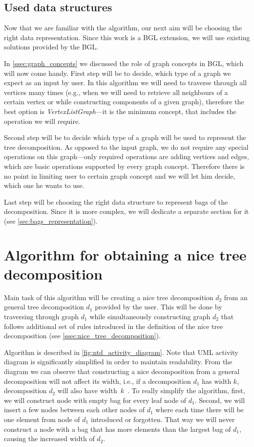 \documentclass[thesis=B,english]{FITthesis}[2019/03/21]
\begin{document}
\subsection{Used data structures}\label{ssec:td_data_structures}
Now that we are familiar with the algorithm, our next aim will be choosing the right data representation. Since this work is a BGL extension, we will use existing solutions provided by the BGL.

In \autoref{ssec:graph_concepts} we discussed the role of graph concepts in BGL, which will now come handy. First step will be to decide, which type of a graph we expect as an input by user. In this algorithm we will need to traverse through all vertices many times (e.g., when we will need to retrieve all neighbours of a certain vertex or while constructing components of a given graph), therefore the best option is \emph{VertexListGraph}---it is the minimum concept, that includes the operation we will require.

Second step will be to decide which type of a graph will be used to represent the tree decomposition. As opposed to the input graph, we do not require any special operations on this graph---only required operations are adding vertices and edges, which are basic operations supported by every graph concept. Therefore there is no point in limiting user to certain graph concept and we will let him decide, which one he wants to use.

Last step will be choosing the right data structure to represent bags of the decomposition. Since it is more complex, we will dedicate a separate section for it (see \autoref{sec:bags_representation}).

\section{Algorithm for obtaining a nice tree decomposition}\label{sec:ntd_algorithm}
Main task of this algorithm will be creating a nice tree decomposition $d_2$ from an general tree decomposition $d_1$ provided by the user. This will be done by traversing through graph $d_1$ while simultaneously constructing graph $d_2$ that follows additional set of rules introduced in the definition of the nice tree decomposition (see \autoref{ssec:nice_tree_decomposition}).

Algorithm is described in \autoref{fig:ntd_activity_diagram}. Note that UML activity diagram is significantly simplified in order to maintain readability. From the diagram we can observe that constructing a nice decomposition from a general decomposition will not affect its width, i.e., if a decomposition $d_1$ has width $k$, decomposition $d_2$ will also have width~$k$~\cite[Chap. 7.2]{param_algo}. To really simplify the algorithm, first, we will construct node with empty bag for every leaf node of $d_1$. Second, we will insert a few nodes between each other nodes of $d_1$ where each time there will be one element from node of $d_1$ introduced or forgotten. That way we will never construct a node with a bag that has more elements than the largest bag of $d_1$, causing the increased width of $d_2$.
\end{document}
